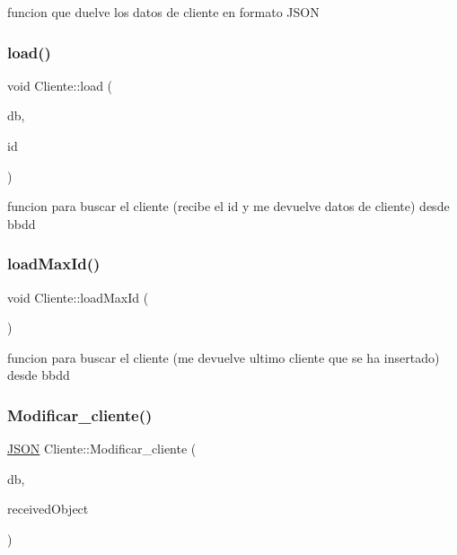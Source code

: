 funcion que duelve los datos de cliente en formato J\+S\+ON\mbox{\label{classCliente_a2fffa29c5f9c5789b4ea383e0a880bb3}} 
\subsubsection{\texorpdfstring{load()}{load()}}
{\footnotesize\ttfamily void Cliente\+::load (\begin{DoxyParamCaption}\item[{Q\+Sql\+Database}]{db,  }\item[{int}]{id }\end{DoxyParamCaption})}

funcion para buscar el cliente (recibe el id y me devuelve datos de cliente) desde bbdd \mbox{\label{classCliente_a00ab8014b69d2a87746dc1a62d26553a}} 
\subsubsection{\texorpdfstring{load\+Max\+Id()}{loadMaxId()}}
{\footnotesize\ttfamily void Cliente\+::load\+Max\+Id (\begin{DoxyParamCaption}{ }\end{DoxyParamCaption})}

funcion para buscar el cliente (me devuelve ultimo cliente que se ha insertado) desde bbdd \mbox{\label{classCliente_a157d0a57e3a159c60395b0ef7cbafec7}} 
\subsubsection{\texorpdfstring{Modificar\+\_\+cliente()}{Modificar\_cliente()}}
{\footnotesize\ttfamily \mbox{\hyperlink{classnlohmann_1_1basic__json}{J\+S\+ON}} Cliente\+::\+Modificar\+\_\+cliente (\begin{DoxyParamCaption}\item[{Q\+Sql\+Database}]{db,  }\item[{\mbox{\hyperlink{classnlohmann_1_1basic__json}{J\+S\+ON}}}]{received\+Object }\end{DoxyParamCaption})}

